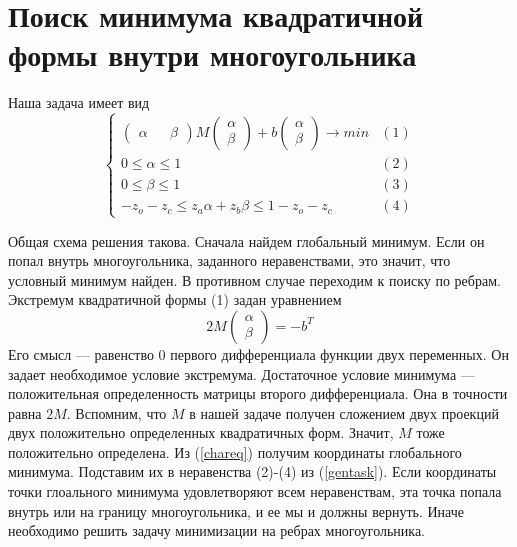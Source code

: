 \documentclass[pdftex,ptm,12pt,a4paper]{report}
\begin{document}
\section{Поиск минимума квадратичной формы внутри многоугольника}
    Наша задача имеет вид
     \begin{equation}\label{gentask}
          \begin{cases}
          \begin{pmatrix} \alpha && \beta \end{pmatrix}
               M
             \begin{pmatrix} \alpha \\ \beta \end{pmatrix} +
             b \begin{pmatrix} \alpha \\ \beta \end{pmatrix} \to min &(1)\\
              0 \le  \alpha   \le  1  &(2)\\
              0 \le  \beta   \le  1  &(3)\\
              -z_o - z_c \le  z_a \alpha + z_b \beta \le  1 -z_o - z_c  &(4)
          \end{cases}
      \end{equation}

      Общая схема решения такова.
      Сначала найдем глобальный минимум.
      Если он попал внутрь многоугольника, заданного неравенствами, это значит, что условный минимум найден.
      В противном случае переходим к поиску по ребрам.
      Экстремум квадратичной формы (1) задан уравнением 
      \begin{equation}\label{chareq}
      2M \begin{pmatrix} \alpha \\ \beta \end{pmatrix} = - b^T
      \end{equation}
      Его смысл --- равенство 0 первого дифференциала функции двух переменных.
      Он задает необходимое условие экстремума.
      Достаточное условие минимума --- положительная определенность матрицы второго дифференциала.
      Она в точности равна $2M$.
      Вспомним, что $M$ в нашей задаче получен сложением двух проекций двух положительно определенных квадратичных форм.
      Значит, $M$ тоже положительно определена.
      Из (\ref{chareq}) получим координаты глобального минимума.
      Подставим их в неравенства (2)-(4) из (\ref{gentask}).
      Если координаты точки глоального минимума удовлетворяют всем неравенствам, эта точка попала внутрь или на границу многоугольника, и ее мы и должны вернуть. 
      Иначе необходимо решить задачу минимизации на ребрах многоугольника.
\end{document}
